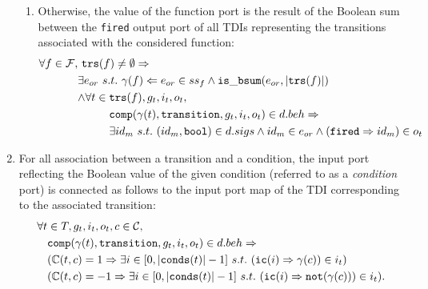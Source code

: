 \begin{definition}
\begin{enumerate}[resume]
\begin{enumerate}
    \item Otherwise, the value of the function port is the result of
      the Boolean sum between the \texttt{fired} output port of all
      TDIs representing the transitions associated with the considered
      function:
      \begin{equation*}
        \begin{aligned}[t]
          \forall{}f\in\mathcal{F},&~\mathtt{trs}(f)\neq\emptyset\Rightarrow \\
                                   &\exists{}e_{or}~s.t.~\gamma(f)\Leftarrow{}e_{or}\in{}ss_f\land\mathtt{is\_bsum}(e_{or},\vert{}\mathtt{trs}(f)\vert) \\
                                   &
                                  \begin{aligned}[t]
                                    \land\forall{}t\in{}& \mathtt{trs}(f),g_t,i_t,o_t,\\
                                                        & \mathtt{comp}(\gamma(t),\mathtt{transition},g_t,i_t,o_t)\in{}d.beh\Rightarrow \\
                                                        & \exists{}id_m~s.t.~(id_m,\mathtt{bool})\in{}d.sigs\land{}id_m\in{}e_{or}\land(\mathtt{fired}\Rightarrow{}id_m)\in{}o_t \\
                                  \end{aligned} \\
        \end{aligned}
      \end{equation*}      
    \end{enumerate}
    
  \item For all association between a transition and a condition, the
    input port reflecting the Boolean value of the given condition
    (referred to as a \textit{condition} port) is connected as follows
    to the input port map of the TDI corresponding to the associated
    transition:
    \begin{equation*}
      \begin{aligned}[t]
        \forall{}t&\in{}T,g_t,i_t,o_t,c\in\mathcal{C}, \\
                  & \mathtt{comp}(\gamma(t),\mathtt{transition},g_t,i_t,o_t)\in{}d.beh\Rightarrow \\
                  & (\mathbb{C}(t,c)=1\Rightarrow\exists{}i\in[0,\vert\mathtt{conds}(t)\vert-1]~s.t.~(\mathtt{ic}(i)\Rightarrow{}\gamma(c))\in{}i_t) \\
                  & (\mathbb{C}(t,c)=-1\Rightarrow\exists{}i\in[0,\vert\mathtt{conds}(t)\vert-1]~s.t.~(\mathtt{ic}(i)\Rightarrow{}\mathtt{not}(\gamma(c)))\in{}i_t). \\
      \end{aligned}
    \end{equation*}
    

  \end{enumerate}

\end{definition}

